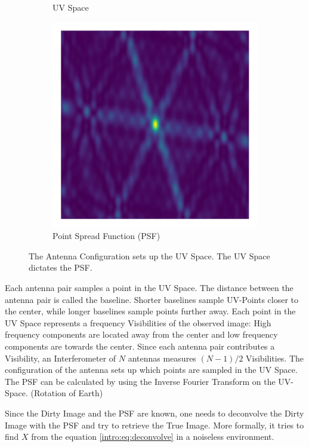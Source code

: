 \begin{figure}[h!]
\begin{subfigure}[b]{0.3\linewidth}
		\caption{UV Space}
	\end{subfigure}
	\begin{subfigure}[b]{0.3\linewidth}
		\includegraphics[width=\linewidth, trim={18px 19px 18px 18px}, clip]{./chapters/01.intro/img/psf.png}
		\caption{Point Spread Function (PSF)}
	\end{subfigure}
	\caption{The Antenna Configuration sets up the UV Space. The UV Space dictates the PSF.}
	\label{intro:ANT_UV_PSF}
\end{figure}

Each antenna pair samples a point in the UV Space. The distance between the antenna pair is called the baseline. Shorter baselines sample UV-Points closer to the center, while longer baselines sample points further away.  Each point in the UV Space represents a frequency Visibilities of the observed image: High frequency components are located away from the center and low frequency components are towards the center. Since each antenna pair contributes a Visibility, an Interferometer of $N$ antennas measures $(N-1)/2$ Visibilities. The configuration of the antenna sets up which points are sampled in the UV Space. The PSF can be calculated by using the Inverse Fourier Transform on the UV-Space. (Rotation of Earth)

Since the Dirty Image and the PSF are known, one needs to deconvolve the Dirty Image with the PSF and try to retrieve the True Image. More formally, it tries to find $X$ from the equation \eqref{intro:eq:deconvolve} in a noiseless environment.

